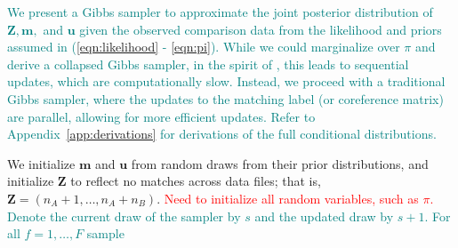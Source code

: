 \documentclass[ba]{imsart}
\begin{document}

\textcolor{teal}{We present a Gibbs sampler to approximate the joint posterior distribution of $\bm{Z}, \bm{m},$ and  $\bm{u}$ given the observed comparison data from the likelihood and priors assumed in (\ref{eqn:likelihood} - \ref{eqn:pi}). While we could marginalize over $\pi$ and derive a collapsed Gibbs sampler, in the spirit of \cite{sadinle_bayesian_2017}, this leads to sequential updates, which are computationally slow. Instead, we proceed with a traditional Gibbs sampler, where the updates to the matching label (or coreference matrix) are parallel, allowing for more efficient updates. Refer to Appendix~\ref{app:derivations} for derivations of the full conditional distributions.}

We initialize $\bm{m}$ and $\bm{u}$ from random draws from their prior distributions, and initialize $\bm{Z}$ to reflect no matches across data files; that is, $\bm{Z} = (n_A + 1, \ldots, n_A + n_B)$. \textcolor{red}{Need to initialize all random variables, such as $\pi$.} \textcolor{teal}{Denote the current draw of the sampler by $s$ and the updated draw by $s+1$.} \textcolor{teal}{For all $f=1, \ldots, F$ sample}


\end{document}
